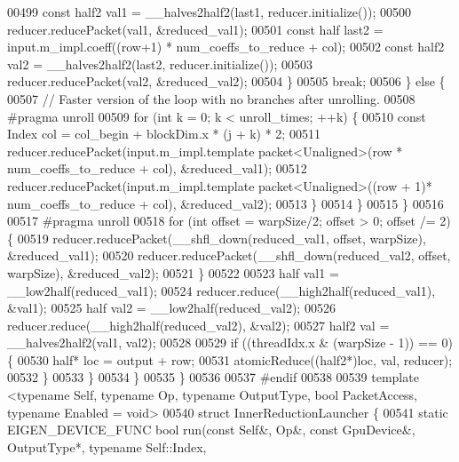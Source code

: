 \begin{DoxyCode}
00499             \textcolor{keyword}{const} half2 val1 = \_\_halves2half2(last1, reducer.initialize());
00500             reducer.reducePacket(val1, &reduced\_val1);
00501             \textcolor{keyword}{const} half last2 = input.m\_impl.coeff((row+1) * num\_coeffs\_to\_reduce + col);
00502             \textcolor{keyword}{const} half2 val2 = \_\_halves2half2(last2, reducer.initialize());
00503             reducer.reducePacket(val2, &reduced\_val2);
00504           \}
00505           \textcolor{keywordflow}{break};
00506         \} \textcolor{keywordflow}{else} \{
00507           \textcolor{comment}{// Faster version of the loop with no branches after unrolling.}
00508 \textcolor{preprocessor}{#pragma unroll}
00509           \textcolor{keywordflow}{for} (\textcolor{keywordtype}{int} k = 0; k < unroll\_times; ++k) \{
00510             \textcolor{keyword}{const} Index col = col\_begin + blockDim.x * (j + k) * 2;
00511             reducer.reducePacket(input.m\_impl.template packet<Unaligned>(row * num\_coeffs\_to\_reduce + col),
       &reduced\_val1);
00512             reducer.reducePacket(input.m\_impl.template packet<Unaligned>((row + 1)* num\_coeffs\_to\_reduce + 
      col), &reduced\_val2);
00513           \}
00514         \}
00515       \}
00516 
00517 \textcolor{preprocessor}{#pragma unroll}
00518       \textcolor{keywordflow}{for} (\textcolor{keywordtype}{int} offset = warpSize/2; offset > 0; offset /= 2) \{
00519         reducer.reducePacket(\_\_shfl\_down(reduced\_val1, offset, warpSize), &reduced\_val1);
00520         reducer.reducePacket(\_\_shfl\_down(reduced\_val2, offset, warpSize), &reduced\_val2);
00521       \}
00522 
00523       half val1 =  \_\_low2half(reduced\_val1);
00524       reducer.reduce(\_\_high2half(reduced\_val1), &val1);
00525       half val2 =  \_\_low2half(reduced\_val2);
00526       reducer.reduce(\_\_high2half(reduced\_val2), &val2);
00527       half2 val = \_\_halves2half2(val1, val2);
00528 
00529       \textcolor{keywordflow}{if} ((threadIdx.x & (warpSize - 1)) == 0) \{
00530         half* loc = output + row;
00531         atomicReduce((half2*)loc, val, reducer);
00532       \}
00533     \}
00534   \}
00535 \}
00536 
00537 \textcolor{preprocessor}{#endif}
00538 
00539 \textcolor{keyword}{template} <\textcolor{keyword}{typename} Self, \textcolor{keyword}{typename} Op, \textcolor{keyword}{typename} OutputType, \textcolor{keywordtype}{bool} PacketAccess, \textcolor{keyword}{typename} Enabled = \textcolor{keywordtype}{void}>
00540 \textcolor{keyword}{struct }InnerReductionLauncher \{
00541   \textcolor{keyword}{static} EIGEN\_DEVICE\_FUNC \textcolor{keywordtype}{bool} run(\textcolor{keyword}{const} Self&, Op&, \textcolor{keyword}{const} GpuDevice&, OutputType*, \textcolor{keyword}{typename} Self::Index, \textcolor{keyword}{
}
\end{DoxyCode}
